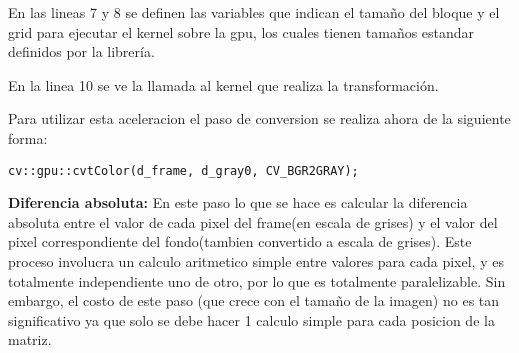 \documentclass[a4paper,10pt]{report}
\begin{document}

% 
% 
% 


En las lineas 7 y 8 se definen las variables que indican el tamaño del bloque y el grid para ejecutar el kernel sobre la gpu, los cuales tienen tamaños estandar definidos por la librería.

En la linea 10 se ve la llamada al kernel que realiza la transformación.


Para utilizar esta aceleracion el paso de conversion se realiza ahora de la siguiente forma:


\begin{lstlisting}[columns=flexible,basicstyle=\ttfamily\small\bfseries]
  cv::gpu::cvtColor(d_frame, d_gray0, CV_BGR2GRAY);
\end{lstlisting}



 
 \textbf{ Diferencia absoluta:} En este paso lo que se hace es calcular la diferencia absoluta entre el valor de cada pixel del frame(en escala de grises) y el valor del pixel correspondiente del fondo(tambien convertido a escala de grises). 
 Este proceso involucra un calculo aritmetico simple entre valores para cada pixel, y es totalmente independiente uno de otro, por lo que es totalmente paralelizable. 
 Sin embargo, el costo de este paso (que crece con el tamaño de la imagen) no es tan significativo ya que solo se debe hacer 1 calculo simple para cada posicion de la matriz.
\end{document}
